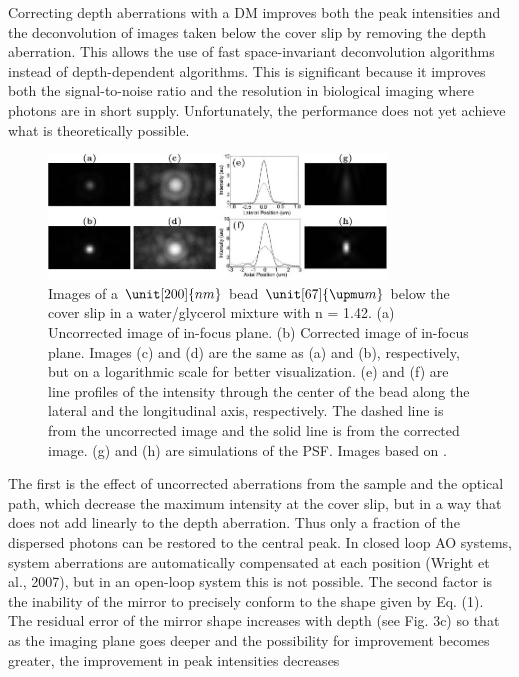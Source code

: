 Correcting depth aberrations with a DM improves both the peak intensities and 
the deconvolution of images taken below the cover slip by removing the depth 
aberration. This allows the use of fast space-invariant deconvolution 
algorithms instead of depth-dependent algorithms. This is significant because 
it improves both the signal-to-noise ratio and the resolution in biological 
imaging where photons are in short supply. Unfortunately, the performance 
does not yet achieve what is theoretically possible.

\begin{figure}[htb]
	\centering
		\includegraphics[width=0.80\textwidth]{images/wide_flour_spher_All.jpg}
	\caption{Images of a $\unit[200]{nm}$ bead $\unit[67]{\upmu m}$ below the 
cover slip in a water/glycerol mixture with n = 1.42.  (a) Uncorrected image 
of in-focus plane. (b) Corrected image of in-focus plane. Images (c) and (d) 
are the same as (a) and (b), respectively, but on a logarithmic scale for 
better visualization. (e) and (f) are line profiles of the intensity through 
the center of the bead along the lateral and the longitudinal axis, 
respectively. The dashed line is from the uncorrected image and the solid 
line is from the corrected image. (g) and (h) are simulations of the PSF. 
Images based on \cite{wide_AOM_FM_spehrical_correction}.}
	\label{fig:wide_flour_spher_All} 
\end{figure}


The first is the effect of uncorrected aberrations from the sample and the 
optical path, which decrease the maximum intensity at the cover slip, but in 
a way that does not add linearly to the depth aberration. Thus only a 
fraction of the dispersed photons can be restored to the central peak. In 
closed loop AO systems, system aberrations are automatically compensated at 
each position (Wright et al., 2007), but in an open-loop system this is not 
possible. The second factor is the inability of the mirror to precisely 
conform to the shape given by Eq. (1). The residual error of the mirror shape 
increases with depth (see Fig. 3c) so that as the imaging plane goes deeper 
and the possibility for improvement becomes greater, the improvement in peak 
intensities decreases

